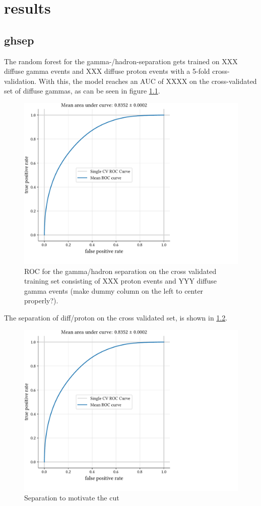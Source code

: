 \chapter{results}\label{results}


\section{ghsep}\label{ghsep}

The random forest for the gamma-/hadron-separation gets trained on 
XXX diffuse gamma events and XXX diffuse proton events with a 5-fold cross-validation.
With this, the model reaches an AUC 
of XXXX on the cross-validated set of diffuse gammas, as can be seen in figure \ref{fig:gh_roc}.

\begin{figure}
    \centering
    \includegraphics[page=1, width=.8\textwidth]{../analysis/plots/cross_val_sep_perf_plot.pdf}
    \caption{ROC for the gamma/hadron separation on the cross validated training set 
    consisting of XXX proton events and YYY diffuse gamma events (make dummy column on the left to center properly?).}
    \label{fig:gh_roc}
\end{figure}

The separation of diff/proton on the cross validated set, is shown in \ref{fig:gh_sep}.
\begin{figure}
    \centering
    \includegraphics[page=2, width=.8\textwidth]{../analysis/plots/cross_val_sep_perf_plot.pdf}
    \caption{Separation to motivate the cut}
    \label{fig:gh_sep}
\end{figure}


